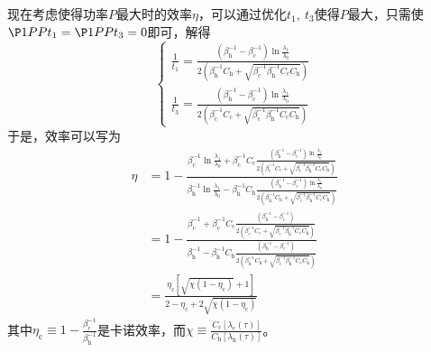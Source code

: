 现在考虑使得功率$P$最大时的效率$\eta$，可以通过优化$t_1,\ t_3$使得$P$最大，只需使$\P1P{P}{t_1}=\P1P{P}{t_3}=0$即可，解得
\begin{equation}
    \left\{\begin{array}{l}
        \frac{1}{t_{1}}=\frac{\left(\beta_{\mathrm{h}}^{-1}-\beta_{\mathrm{c}}^{-1}\right) \ln \frac{\lambda_{1}}{\lambda_{0}}}{2\left(\beta_{\mathrm{h}}^{-1} C_{\mathrm{h}}+\sqrt{\beta_{\mathrm{c}}^{-1} \beta_{\mathrm{h}}^{-1} C_{\mathrm{c}} C_{\mathrm{h}}}\right)}\\
        \frac{1}{t_{3}}=\frac{\left(\beta_{\mathrm{h}}^{-1}-\beta_{\mathrm{c}}^{-1}\right) \ln \frac{\lambda_{1}}{\lambda_{0}}}{2\left(\beta_{\mathrm{c}}^{-1} C_{\mathrm{c}}+\sqrt{\beta_{\mathrm{c}}^{-1} \beta_{\mathrm{h}}^{-1} C_{\mathrm{c}} C_{\mathrm{h}}}\right)}
    \end{array}\right.
    \label{eq3.36}
\end{equation}
于是，效率可以写为
\begin{equation}
    \begin{split}
        \eta&=1- \frac{\beta_{\mathrm{c}}^{-1} \ln{\frac{\lambda_1}{\lambda_0}} + \beta_{\mathrm{c}}^{-1} C_{\mathrm{c}} \frac{\left(\beta_{\mathrm{h}}^{-1}-\beta_{\mathrm{c}}^{-1}\right) \ln \frac{\lambda_{1}}{\lambda_{0}}}{2\left(\beta_{\mathrm{c}}^{-1} C_{\mathrm{c}}+\sqrt{\beta_{\mathrm{c}}^{-1} \beta_{\mathrm{h}}^{-1} C_{\mathrm{c}} C_{\mathrm{h}}}\right)}}{\beta_{\mathrm{h}}^{-1} \ln{\frac{\lambda_1}{\lambda_0}} - \beta_{\mathrm{h}}^{-1} C_{\mathrm{h}} \frac{\left(\beta_{\mathrm{h}}^{-1}-\beta_{\mathrm{c}}^{-1}\right) \ln \frac{\lambda_{1}}{\lambda_{0}}}{2\left(\beta_{\mathrm{h}}^{-1} C_{\mathrm{h}}+\sqrt{\beta_{\mathrm{c}}^{-1} \beta_{\mathrm{h}}^{-1} C_{\mathrm{c}} C_{\mathrm{h}}}\right)}}\\
        &=1- \frac{\beta_{\mathrm{c}}^{-1}  + \beta_{\mathrm{c}}^{-1} C_{\mathrm{c}} \frac{\left(\beta_{\mathrm{h}}^{-1}-\beta_{\mathrm{c}}^{-1}\right) }{2\left(\beta_{\mathrm{c}}^{-1} C_{\mathrm{c}}+\sqrt{\beta_{\mathrm{c}}^{-1} \beta_{\mathrm{h}}^{-1} C_{\mathrm{c}} C_{\mathrm{h}}}\right)}}{\beta_{\mathrm{h}}^{-1}  - \beta_{\mathrm{h}}^{-1} C_{\mathrm{h}} \frac{\left(\beta_{\mathrm{h}}^{-1}-\beta_{\mathrm{c}}^{-1}\right) }{2\left(\beta_{\mathrm{h}}^{-1} C_{\mathrm{h}}+\sqrt{\beta_{\mathrm{c}}^{-1} \beta_{\mathrm{h}}^{-1} C_{\mathrm{c}} C_{\mathrm{h}}}\right)}}\\
        &=\frac{\eta_{\mathrm{c}}\left[\sqrt{\chi(1-\eta_{\mathrm{c}})}+1\right]}{2-\eta_{\mathrm{c}}+2 \sqrt{\chi\left(1-\eta_{\mathrm{c}}\right)}}
    \end{split}
    \label{eq3.37}
\end{equation}
其中$\eta_{\mathrm{c}}\equiv 1-\frac{\beta_{\mathrm{c}}^{-1}}{\beta_{\mathrm{h}}^{-1}}$是卡诺效率，而$\chi\equiv\frac{C_{\mathrm{c}} [\lambda_{\mathrm{c}}(\tau)]}{C_{\mathrm{h}} [\lambda_{\mathrm{h}}(\tau)]}$。


